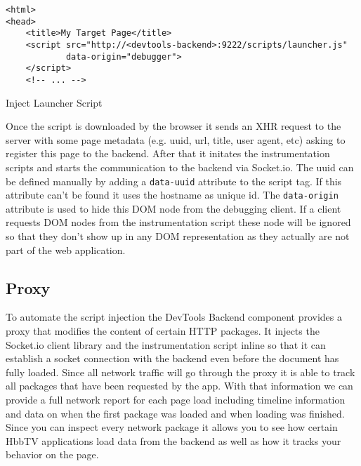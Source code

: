 \vspace{0.3cm}
\begin{listing}[H]
\begin{verbatim}
<html>
<head>
    <title>My Target Page</title>
    <script src="http://<devtools-backend>:9222/scripts/launcher.js"
            data-origin="debugger">
    </script>
    <!-- ... -->
\end{verbatim}
\caption{Inject Launcher Script}
\label{lst:launcher}
\end{listing}

Once the script is downloaded by the browser it sends an XHR request to the server with some page metadata
(e.g. uuid, url, title, user agent, etc) asking to register this page to the backend. After that it
initates the instrumentation scripts and starts the communication to the backend via Socket.io. The uuid
can be defined manually by adding a \texttt{data-uuid} attribute to the script tag. If this attribute
can't be found it uses the hostname as unique id. The \texttt{data-origin} attribute is used to hide this
DOM node from the debugging client. If a client requests DOM nodes from the instrumentation script these
node will be ignored so that they don't show up in any DOM representation as they actually are not part
of the web application.

\subsection{Proxy\label{sec:proxy}}

To automate the script injection the DevTools Backend component provides a proxy that modifies the content
of certain HTTP packages. It injects the Socket.io client library and the instrumentation script inline so
that it can establish a socket connection with the backend even before the document has fully loaded.
Since all network traffic will go through the proxy it is able to track all packages that have been
requested by the app. With that information we can provide a full network report for each page load
including timeline information and data on when the first package was loaded and when loading was finished.
Since you can inspect every network package it allows you to see how certain HbbTV applications load data
from the backend as well as how it tracks your behavior on the page.

